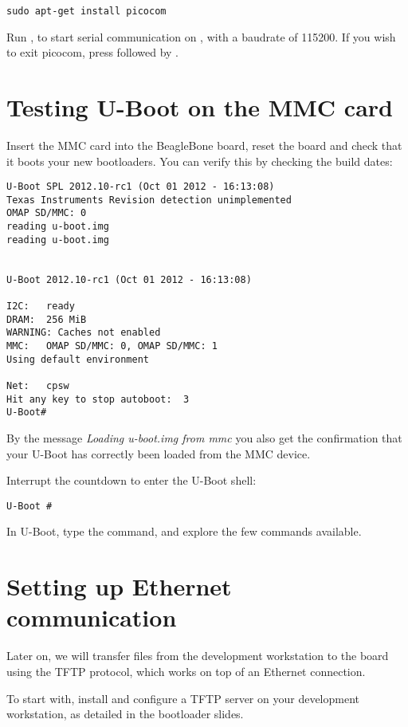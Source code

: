 \begin{verbatim}
sudo apt-get install picocom
\end{verbatim}

Run , to start serial
communication on , with a baudrate of 115200. If
you wish to exit picocom, press \code{[Ctrl][a]} followed by
\code{[Ctrl][x]}.

\section{Testing U-Boot on the MMC card}

Insert the MMC card into the BeagleBone board, reset the board and check
that it boots your new bootloaders. You can verify this by checking
the build dates:

\begin{verbatim}
U-Boot SPL 2012.10-rc1 (Oct 01 2012 - 16:13:08)
Texas Instruments Revision detection unimplemented
OMAP SD/MMC: 0
reading u-boot.img
reading u-boot.img


U-Boot 2012.10-rc1 (Oct 01 2012 - 16:13:08)

I2C:   ready
DRAM:  256 MiB
WARNING: Caches not enabled
MMC:   OMAP SD/MMC: 0, OMAP SD/MMC: 1
Using default environment

Net:   cpsw
Hit any key to stop autoboot:  3
U-Boot#
\end{verbatim}

By the message {\em Loading u-boot.img from mmc} you also get the
confirmation that your U-Boot has correctly been loaded from the MMC
device.

Interrupt the countdown to enter the U-Boot shell:
\begin{verbatim}
U-Boot #
\end{verbatim}

In U-Boot, type the  command, and explore the few commands available.

\section{Setting up Ethernet communication}

Later on, we will transfer files from the development workstation to
the board using the TFTP protocol, which works on top of an Ethernet
connection.

To start with, install and configure a TFTP server on your development
workstation, as detailed in the bootloader slides.

